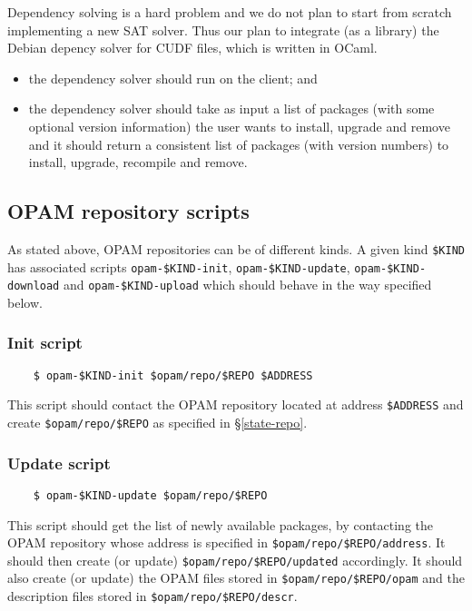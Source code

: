 \documentclass[a4paper,11pt]{article}
\begin{document}
Dependency solving is a hard problem and we do not plan to start from
scratch implementing a new SAT solver. Thus our plan to integrate (as
a library) the Debian depency solver for CUDF files, which is written
in OCaml.

\begin{itemize}
\item the dependency solver should run on the client; and
\item the dependency solver should take as input a list of packages
  (with some optional version information) the user wants to install,
  upgrade and remove and it should return a consistent list of
  packages (with version numbers) to install, upgrade, recompile and
  remove.
\end{itemize}

\subsection{OPAM repository scripts}
\label{scripts}

As stated above, OPAM repositories can be of different kinds. A given
kind \verb+$KIND+ has associated scripts \verb+opam-$KIND-init+,
\verb+opam-$KIND-update+, \verb+opam-$KIND-download+ and
\verb+opam-$KIND-upload+ which should behave in the way specified
below.

\subsubsection{Init script}
\label{script-init}

\begin{verbatim}
    $ opam-$KIND-init $opam/repo/$REPO $ADDRESS
\end{verbatim}

This script should contact the OPAM repository located at address
\verb+$ADDRESS+ and create \verb+$opam/repo/$REPO+ as specified in
\S\ref{state-repo}.

\subsubsection{Update script}
\label{script-update}

\begin{verbatim}
    $ opam-$KIND-update $opam/repo/$REPO
\end{verbatim}

This script should get the list of newly available packages, by
contacting the OPAM repository whose address is specified in
\verb+$opam/repo/$REPO/address+. It should then create (or update)
\verb+$opam/repo/$REPO/updated+ accordingly. It should also create (or
update) the OPAM files stored in \verb+$opam/repo/$REPO/opam+ and the
description files stored in \verb+$opam/repo/$REPO/descr+.
\end{document}
